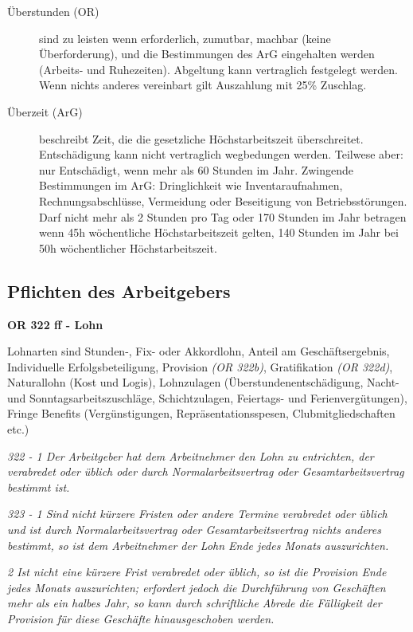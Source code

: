 \begin{description}
  \item[Überstunden (OR)] sind zu leisten wenn erforderlich, zumutbar, machbar (keine Überforderung), und die Bestimmungen des ArG eingehalten werden (Arbeits- und Ruhezeiten). Abgeltung kann vertraglich festgelegt werden. Wenn nichts anderes vereinbart gilt Auszahlung mit 25\% Zuschlag.
  \item[Überzeit (ArG)] beschreibt Zeit, die die gesetzliche Höchstarbeitszeit überschreitet. Entschädigung kann nicht vertraglich wegbedungen werden. Teilwese aber: nur Entschädigt, wenn mehr als 60 Stunden im Jahr. Zwingende Bestimmungen im ArG: Dringlichkeit wie Inventaraufnahmen, Rechnungsabschlüsse, Vermeidung oder Beseitigung von Betriebsstörungen. Darf nicht mehr als 2 Stunden pro Tag oder 170 Stunden im Jahr betragen wenn 45h wöchentliche Höchstarbeitszeit gelten, 140 Stunden im Jahr bei 50h wöchentlicher Höchstarbeitszeit. 
\end{description}

\subsection{Pflichten des Arbeitgebers}

\noindent
\textbf{OR 322 ff - Lohn}

Lohnarten sind Stunden-, Fix- oder Akkordlohn, Anteil am Geschäftsergebnis, Individuelle Erfolgsbeteiligung, Provision \textit{(OR 322b)}, Gratifikation \textit{(OR 322d)}, Naturallohn (Kost und Logis), Lohnzulagen (Überstundenentschädigung, Nacht- und Sonntagsarbeitszuschläge, Schichtzulagen, Feiertags- und Ferienvergütungen), Fringe Benefits (Vergünstigungen, Repräsentationsspesen, Clubmitgliedschaften etc.) 

\textit{322 - 1 Der Arbeitgeber hat dem Arbeitnehmer den Lohn zu entrichten, der verabredet oder üblich oder durch Normalarbeitsvertrag oder Gesamtarbeitsvertrag bestimmt ist.}

\textit{323 - 1 Sind nicht kürzere Fristen oder andere Termine verabredet oder üblich und ist durch Normalarbeitsvertrag oder Gesamtarbeitsvertrag nichts anderes bestimmt, so ist dem Arbeitnehmer der Lohn Ende jedes Monats auszurichten.}

\textit{2 Ist nicht eine kürzere Frist verabredet oder üblich, so ist die Provision Ende jedes Monats auszurichten; erfordert jedoch die Durchführung von Geschäften mehr als ein halbes Jahr, so kann durch schriftliche Abrede die Fälligkeit der Provision für diese Geschäfte hinausgeschoben werden.}

